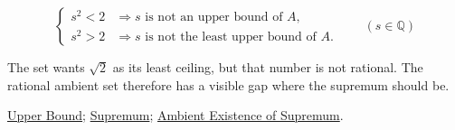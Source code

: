 \begin{remark*}
\[
\begin{cases}
s^2<2 &\Longrightarrow s\text{ is not an upper bound of }A,\\
s^2>2 &\Longrightarrow s\text{ is not the least upper bound of }A.
\end{cases}
\qquad(s\in\mathbb{Q})
\]
\end{remark*}

\begin{remark*}[Interpretation]
The set wants $\sqrt{2}$ as its least ceiling, but that number is not rational. The rational ambient set therefore has a visible gap where the supremum should be.
\end{remark*}

\begin{dependencies}
\hyperref[def:upper-bound]{Upper Bound};
\hyperref[def:supremum]{Supremum};
\hyperref[thm:ambient-existence-supremum]{Ambient Existence of Supremum}.
\end{dependencies}
























